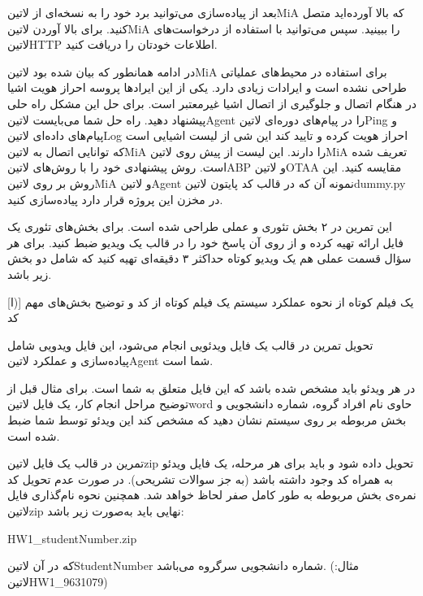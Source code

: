 \documentclass[]{assignment}
\begin{document}
بعد از پیاده‌سازی می‌توانید برد خود را به نسخه‌ای از ‌لاتین{MiA} که بالا آورده‌اید متصل کنید.
برای بالا آوردن ‌لاتین{MiA}  را ببینید.
سپس می‌توانید با استفاده از درخواست‌های ‌لاتین{HTTP} اطلاعات خودتان را دریافت کنید.

در ادامه همانطور که بیان شده بود ‌لاتین{MiA} برای استفاده در محیط‌های عملیاتی طراحی نشده است و ایرادات زیادی دارد. یکی از این ایرادها پروسه احراز هویت اشیا
در هنگام اتصال و جلوگیری از اتصال اشیا غیرمعتبر است. برای حل این مشکل راه حلی پیشنهاد دهید. راه حل شما می‌بایست ‌لاتین{Agent} را در پیام‌های دوره‌ای
‌لاتین{Ping} و پیام‌های داده‌ای ‌لاتین{Log} احراز هویت کرده و تایید کند این شی از لیست اشیایی است که توانایی اتصال به ‌لاتین{MiA}
را دارند. این لیست از پیش روی ‌لاتین{MiA} تعریف شده است. روش پیشنهادی خود را با روش‌های ‌لاتین{ABP} و ‌لاتین{OTAA} مقایسه کنید.
این روش بر روی ‌لاتین{MiA} و ‌لاتین{Agent} نمونه آن که در قالب کد پایتون ‌لاتین{dummy.py} در مخزن این پروژه قرار دارد پیاده‌سازی کنید.



 این تمرین در ۲ بخش تئوری و عملی طراحی شده است.
برای بخش‌های تئوری یک فایل ارائه تهیه کرده و از روی آن پاسخ خود را در قالب یک ویدیو ضبط کنید.
برای هر سؤال قسمت عملی هم یک ویدیو کوتاه حداکثر ۳ دقیقه‌ای تهیه کنید که شامل دو بخش زیر باشد.

[ا)]
 یک فیلم کوتاه از نحوه عملکرد سیستم
 یک فیلم کوتاه از کد و توضیح بخش‌های مهم کد

 تحویل تمرین در قالب یک فایل ویدئویی انجام می‌شود، این فایل ویدویی شامل پیاده‌سازی و عملکرد ‌لاتین{Agent} شما است.

 در هر ویدئو باید مشخص شده باشد که این فایل متعلق به شما است. برای مثال قبل از توضیح مراحل انجام کار، یک فایل ‌لاتین{word}
حاوی نام افراد گروه، شماره دانشجویی و بخش مربوطه بر روی سیستم نشان دهید که مشخص کند این ویدئو توسط شما ضبط شده است.

 تمرین در قالب یک فایل ‌لاتین{zip} تحویل داده شود و باید برای هر مرحله، یک فایل ویدئو به همراه کد وجود داشته باشد (به جز سوالات تشریحی).
در صورت عدم تحویل کد نمره‌ی بخش مربوطه به طور کامل صفر لحاظ خواهد شد. همچنین نحوه نام‌گذاری فایل ‌لاتین{zip} نهایی باید به‌صورت زیر باشد:

HW1\_studentNumber.zip

که در آن ‌لاتین{StudentNumber} شماره دانشجویی سرگروه می‌باشد. (مثال: ‌لاتین{HW1\_9631079})
\end{document}
